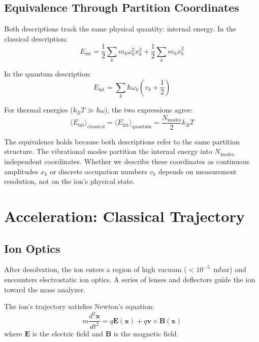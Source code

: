 \documentclass[12pt,a4paper]{article}
\theoremstyle{remark}
\begin{document}
\subsection{Equivalence Through Partition Coordinates}

Both descriptions track the same physical quantity: internal energy. In the classical description:
\begin{equation}
E_{\text{int}} = \frac{1}{2} \sum_k m_k \omega_k^2 x_k^2 + \frac{1}{2} \sum_k m_k \dot{x}_k^2
\end{equation}

In the quantum description:
\begin{equation}
E_{\text{int}} = \sum_k \hbar \omega_k \left(v_k + \frac{1}{2}\right)
\end{equation}

For thermal energies ($k_B T \gg \hbar \omega$), the two expressions agree:
\begin{equation}
\langle E_{\text{int}} \rangle_{\text{classical}} = \langle E_{\text{int}} \rangle_{\text{quantum}} = \frac{N_{\text{modes}}}{2} k_B T
\end{equation}

The equivalence holds because both descriptions refer to the same partition structure. The vibrational modes partition the internal energy into $N_{\text{modes}}$ independent coordinates. Whether we describe these coordinates as continuous amplitudes $x_k$ or discrete occupation numbers $v_k$ depends on measurement resolution, not on the ion's physical state.


\section{Acceleration: Classical Trajectory}
\label{sec:acceleration}

\subsection{Ion Optics}

After desolvation, the ion enters a region of high vacuum ($< 10^{-5}$~mbar) and encounters electrostatic ion optics. A series of lenses and deflectors guide the ion toward the mass analyzer.

The ion's trajectory satisfies Newton's equation:
\begin{equation}
m \frac{d^2 \mathbf{x}}{dt^2} = q \mathbf{E}(\mathbf{x}) + q \mathbf{v} \times \mathbf{B}(\mathbf{x})
\end{equation}
where $\mathbf{E}$ is the electric field and $\mathbf{B}$ is the magnetic field.
\end{document}
